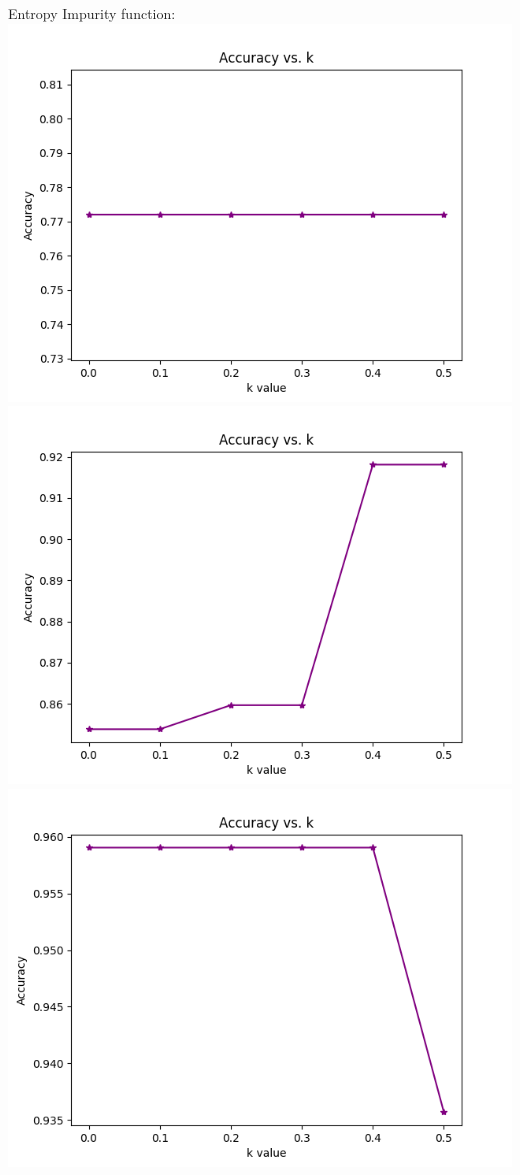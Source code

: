 \documentclass[12pt, letterpaper]{article}
\begin{document}
\begin{enumerate}[label=\Roman*.]
\begin{enumerate}[label=\arabic*.]
		Entropy Impurity function: \\
		\includegraphics[scale=0.5]{../images/accuracy_validation_DT_Threshold_entropy_2.png} 
		\includegraphics[scale=0.5]{../images/accuracy_validation_DT_Threshold_entropy_4.png} 
		\includegraphics[scale=0.5]{../images/accuracy_validation_DT_Threshold_entropy_6.png} \\
		

\end{enumerate}
\end{enumerate}
\end{document}
